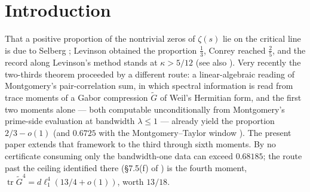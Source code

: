 \documentclass[11pt]{article}
\numberwithin{equation}{section}
\theoremstyle{definition}
\theoremstyle{remark}
\begin{document}
\begin{abstract}
$C_5=\tfrac1{36}$, $\{4,2\}=-\tfrac{23}{420}$ and
$\{6\}=-\tfrac1{126}$, each certified in exact rational
arithmetic --- every term lifted to a rational polytope volume
and evaluated by an exact facet recursion, $1310$ per-term
fractions archived, two independent symbolic methods agreeing
fraction by fraction --- and independently confirmed by
seven-rung Romberg ladders converging at machine precision
(adjacent-row drift $2\times10^{-16}$), calibrated against two
exact anchors in the same run, with $\{4,2\}$ hitting its
pre-registered candidate (\S\ref{s:five:conn}); the
consumption layer (inertia, tail, counting) is that of
\cite{C26}, recalled in \S\ref{s:frame}.
The consumption step itself is exact: a rational sum-of-squares
dual certificate, kernel-checked in core Lean~4 (twenty-one theorems across the
identity, local-law and certificate layers, zero
\texttt{sorry}). A standalone reproduction and
certification package accompanies the paper
(\url{https://github.com/JoshuaHKU/zeta-0.7947-reproduction});
a falsifier registry
($202$ pre-registered checks, $35$ fired and converted, all
forward-recorded) documents the research trail.
\end{abstract}

\newpage
\tableofcontents
\newpage
\section{Introduction}\label{s:intro}

That a positive proportion of the nontrivial zeros of $\zeta(s)$
lie on the critical line is due to Selberg \cite{Sel42}; Levinson
\cite{Lev74} obtained the proportion $\tfrac13$, Conrey
\cite{Con89} reached $\tfrac25$, and the record along Levinson's
method stands at $\kappa>5/12$ \cite{PRZZ} (see also
\cite{BCY11,Fen12}). Very recently the two-thirds theorem
\cite{C26} proceeded by a different route: a linear-algebraic
reading of Montgomery's pair-correlation sum, in which spectral
information is read from trace moments of a Gabor compression
$\widetilde G$ of Weil's Hermitian form, and the first two
moments alone --- both computable unconditionally from
Montgomery's prime-side evaluation at bandwidth $\lambda\le1$
\cite{Mon73,BGST} --- already yield the proportion $2/3-o(1)$
(and $0.6725$ with the Montgomery--Taylor window \cite{Mon75}).
The present paper extends that framework to the third through
sixth moments. By \cite[Rem.~1.1]{C26} no certificate consuming
only the bandwidth-one data can exceed $0.68185$; the route past
the ceiling identified there (\S7.5(f) of \cite{C26}) is the
fourth moment,
$\operatorname{tr}\widetilde G^{4}=d\ell_1^{4}(13/4+o(1))$, worth
$13/18$.
\end{document}
